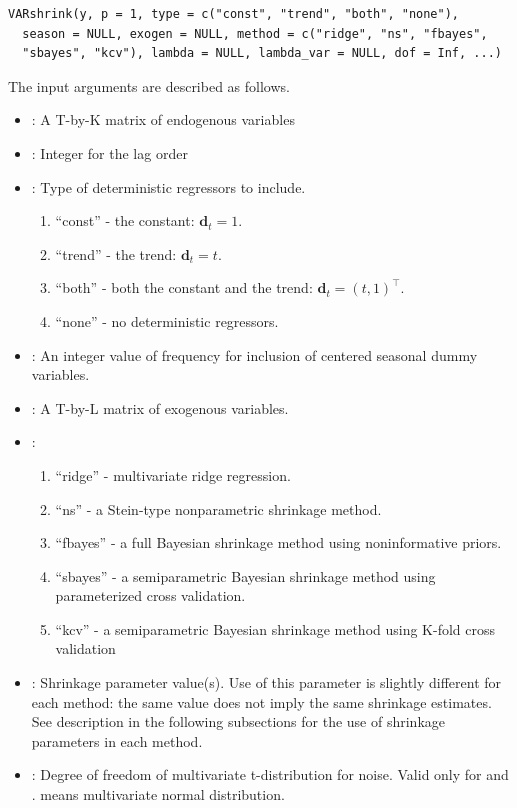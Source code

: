 \documentclass[
]{jss}
\providecommand{\tightlist}{%
  \setlength{\itemsep}{0pt}\setlength{\parskip}{0pt}}
\begin{document}
\begin{verbatim}
VARshrink(y, p = 1, type = c("const", "trend", "both", "none"),
  season = NULL, exogen = NULL, method = c("ridge", "ns", "fbayes",
  "sbayes", "kcv"), lambda = NULL, lambda_var = NULL, dof = Inf, ...)
\end{verbatim}

The input arguments are described as follows.

\begin{itemize}
\tightlist
\item
  : A T-by-K matrix of endogenous variables
\item
  : Integer for the lag order
\item
  : Type of deterministic regressors to include.

  \begin{enumerate}
  \def\labelenumi{\arabic{enumi})}
  \tightlist
  \item
    ``const'' - the constant: \(\mathbf{d}_t = 1\).
  \item
    ``trend'' - the trend: \(\mathbf{d}_t = t\).
  \item
    ``both'' - both the constant and the trend:
    \(\mathbf{d}_t = (t, 1)^\top\).
  \item
    ``none'' - no deterministic regressors.
  \end{enumerate}
\item
  : An integer value of frequency for inclusion of centered
  seasonal dummy variables.
\item
  : A T-by-L matrix of exogenous variables.
\item
  :

  \begin{enumerate}
  \def\labelenumi{\arabic{enumi})}
  \tightlist
  \item
    ``ridge'' - multivariate ridge regression.
  \item
    ``ns'' - a Stein-type nonparametric shrinkage method.
  \item
    ``fbayes'' - a full Bayesian shrinkage method using noninformative
    priors.
  \item
    ``sbayes'' - a semiparametric Bayesian shrinkage method using
    parameterized cross validation.
  \item
    ``kcv'' - a semiparametric Bayesian shrinkage method using K-fold
    cross validation
  \end{enumerate}
\item
  : Shrinkage parameter value(s). Use of this
  parameter is slightly different for each method: the same value does
  not imply the same shrinkage estimates. See description in the
  following subsections for the use of shrinkage parameters in each
  method.
\item
  : Degree of freedom of multivariate t-distribution for
  noise. Valid only for  and
  .  means multivariate normal
  distribution.
\end{itemize}
\end{document}
